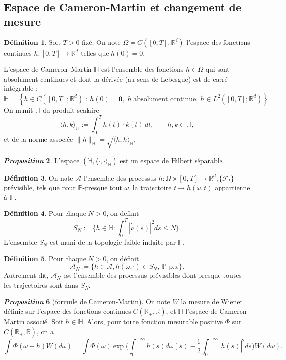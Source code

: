 \documentclass[12pt,a4paper,twoside]{book}%
\theoremstyle{definition}
\newtheorem{dfn}{Définition}[section]
\newtheorem{prop}[dfn]{\textit{Proposition}}
\numberwithin{equation}{section}
\begin{document}
\subsection{Espace de Cameron-Martin et changement de mesure}
\begin{dfn}
	Soit $T>0$ fixé. On note $\Omega = C([0,T],\mathbb{R}^d)$ l'espace des fonctions continues $h : [0,T] \to \mathbb{R}^d$ telles que $h(0) = 0$.
	
	L'espace de Cameron–Martin $\mathbb{H}$ est l'ensemble des fonctions $h \in \Omega$ qui sont absolument continues et dont la dérivée (au sens de Lebesgue) est de carré intégrable :
	\[
	\mathbb{H} = \left\{ h \in C([0,T];\mathbb{R}^d) \;:\; h(0)=\mathbf{0},\; h \text{ absolument continue},\; \dot{h} \in L^2([0,T];\mathbb{R}^d) \right\}.
	\]
	On munit $\mathbb{H}$ du produit scalaire
	\[
	\langle h,k \rangle_{\mathbb{H}} := \int_{0}^{T} \dot{h}(t) \cdot \dot{k}(t) \, dt, \qquad h,k \in \mathbb{H},
	\]
	et de la norme associée $\|h\|_{\mathbb{H}} = \sqrt{\langle h,h \rangle_{\mathbb{H}}}$.
\end{dfn}

\begin{prop}
	L'espace $(\mathbb{H}, \langle\cdot,\cdot\rangle_{\mathbb{H}})$ est un espace de Hilbert séparable.
\end{prop}
\begin{dfn}
	On note $\mathcal{A}$ l'ensemble des processus $h:\Omega\times[0,T]\to\mathbb{R}^d,\{\mathcal{F}_t\}$-prévisible, tels que pour $\mathbb{P}$-presque tout $\omega$, la trajectoire $t\to h(\omega,t)$ appartienne à $\mathbb{H}$.
\end{dfn}
	\begin{dfn}Pour chaque $N>0$, on définit
	\[
	S_N:=\Big\{h\in\mathbb{H}:\int_{0}^{T}|\dot{h}(s)|^2ds\leq N \Big\}.
	\]
	L'ensemble $S_N$ est muni de la topologie faible induite par $\mathbb{H}$.
\end{dfn}
\begin{dfn}
Pour chaque $N>0$, on définit
\[
\mathcal{A}_{N}:=\big\{h\in\mathcal{A},h(\omega,\cdot)\in S_{N},\ \mathbb{P}\text{-p.s.}\big\}.
\]
Autrement dit, $\mathcal{A}_N$ est l'ensemble des processus prévisibles dont presque toutes les trajectoires sont dans $S_N$.
\end{dfn}
\begin{prop}[formule de Cameron-Martin]
	On note $W$ la mesure de Wiener définie sur l'espace des fonctions continues $C(\mathbb{R}_+,\mathbb{R})$, et $\mathbb{H}$ l'espace de Cameron-Martin associé. Soit $h\in\mathbb{H}$. Alors, pour toute fonction mesurable positive $\Phi$ sur $C(\mathbb{R}_+,\mathbb{R})$, on a
	\[
	\int \Phi(\omega+h)W(d\omega)=\int \Phi(\omega)\exp\big(\int_{0}^{+\infty}\dot{h}(s)d\omega (s)-\frac{1}{2}\int_{0}^{+\infty}|\dot{h}(s)|^2ds\big)W(d\omega).
	\]
\end{prop}
\end{document}
